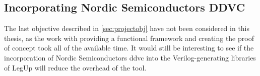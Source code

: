 \subsection{Incorporating Nordic Semiconductors DDVC}
The last objective described in \cref{sec:projectobj} have not been considered in this thesis, as the work with providing a functional framework and creating the proof of concept took all of the available time. It would still be interesting to see if the incorporation of Nordic Semiconductors \gls{ddvc} into the Verilog-generating libraries of LegUp will reduce the overhead of the tool.